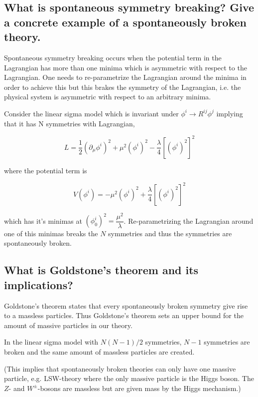 \documentclass[paper=a4, fontsize=11pt]{scrartcl} %
\numberwithin{equation}{section} %
\numberwithin{figure}{section} %
\numberwithin{table}{section} %
\newcommand{\parentheses}[1]{\ensuremath{\left( #1 \right)}}
\begin{document}
\subsection{What is spontaneous symmetry breaking? Give a concrete example of a spontaneously broken theory.}
Spontaneous symmetry breaking occurs when the potential term in the Lagrangian has more than one minima which is asymmetric with respect to the Lagrangian. One needs to re-parametrize the Lagrangian around the minima in order to achieve this but this brakes the symmetry of the Lagrangian, i.e. the physical system is asymmetric with respect to an arbitrary minima.

Consider the linear sigma model which is invariant under $\phi^i \rightarrow R^{ij} \phi^j$ implying that it has N symmetries with Lagrangian,

\begin{equation}
L=\dfrac{1}{2}\parentheses{\partial_{\mu}\phi^i}^2 + \mu^2 \parentheses{\phi^i}^2  - \dfrac{\lambda}{4}\left[ \parentheses{\phi^i}^2 \right]^2
\label{eq:linearsigma}
\end{equation}

where the potential term is

\begin{equation}
V \parentheses{\phi^i}=- \mu^2 \parentheses{\phi^i}^2 + \dfrac{\lambda}{4}\left[ \parentheses{\phi^i}^2 \right]^2
\end{equation}

which has it's minimas at $\parentheses{\phi^i_0}^2=\dfrac{\mu^2}{\lambda}$. Re-parametrizing the Lagrangian around one of this minimas breaks the $N$ symmetries and thus the symmetries are spontaneously broken.

\subsection{What is Goldstone's theorem and its implications?}
Goldstone's theorem states that every spontaneously broken symmetry give rise to a massless particles. Thus Goldstone's theorem sets an upper bound for the amount of massive particles in our theory.

In the linear sigma model with $N(N-1)/2$ symmetries, $N-1$ symmetries are broken and the same amount of massless particles are created.

(This implies that spontaneously broken theories can only have one massive particle, e.g. LSW-theory where the only massive particle is the Higgs boson. The $Z$- and $W^\pm$-bosons are massless but are given mass by the Higgs mechanism.)
\end{document}
